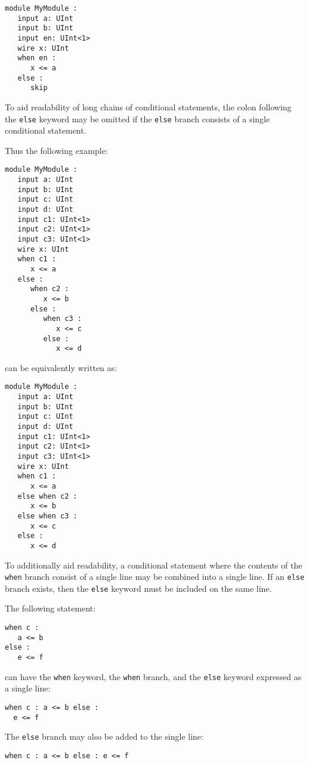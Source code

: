 \documentclass[12pt]{article}
\begin{document}
\begin{lstlisting}
module MyModule :
   input a: UInt
   input b: UInt
   input en: UInt<1>
   wire x: UInt
   when en :
      x <= a
   else :
      skip
\end{lstlisting}

To aid readability of long chains of conditional statements, the colon following the \verb|else| keyword may be omitted if the \verb|else| branch consists of a single conditional statement.

Thus the following example:

\begin{lstlisting}
module MyModule :
   input a: UInt
   input b: UInt
   input c: UInt
   input d: UInt
   input c1: UInt<1>
   input c2: UInt<1>
   input c3: UInt<1>
   wire x: UInt
   when c1 :
      x <= a
   else :
      when c2 :
         x <= b
      else :
         when c3 :
            x <= c
         else :
            x <= d
\end{lstlisting}

can be equivalently written as:

\begin{lstlisting}
module MyModule :
   input a: UInt
   input b: UInt
   input c: UInt
   input d: UInt
   input c1: UInt<1>
   input c2: UInt<1>
   input c3: UInt<1>
   wire x: UInt
   when c1 :
      x <= a
   else when c2 :
      x <= b
   else when c3 :
      x <= c
   else :
      x <= d
\end{lstlisting}

To additionally aid readability, a conditional statement where the contents of the \verb|when| branch consist of a single line may be combined into a single line.
If an \verb|else| branch exists, then the \verb|else| keyword must be included on the same line.

The following statement:
\begin{lstlisting}
when c :
   a <= b
else :
   e <= f
\end{lstlisting}

can have the \verb|when| keyword, the \verb|when| branch, and the \verb|else| keyword expressed as a single line:

\begin{lstlisting}
when c : a <= b else :
  e <= f
\end{lstlisting}

The \verb|else| branch may also be added to the single line:

\begin{lstlisting}
when c : a <= b else : e <= f
\end{lstlisting}
\end{document}

